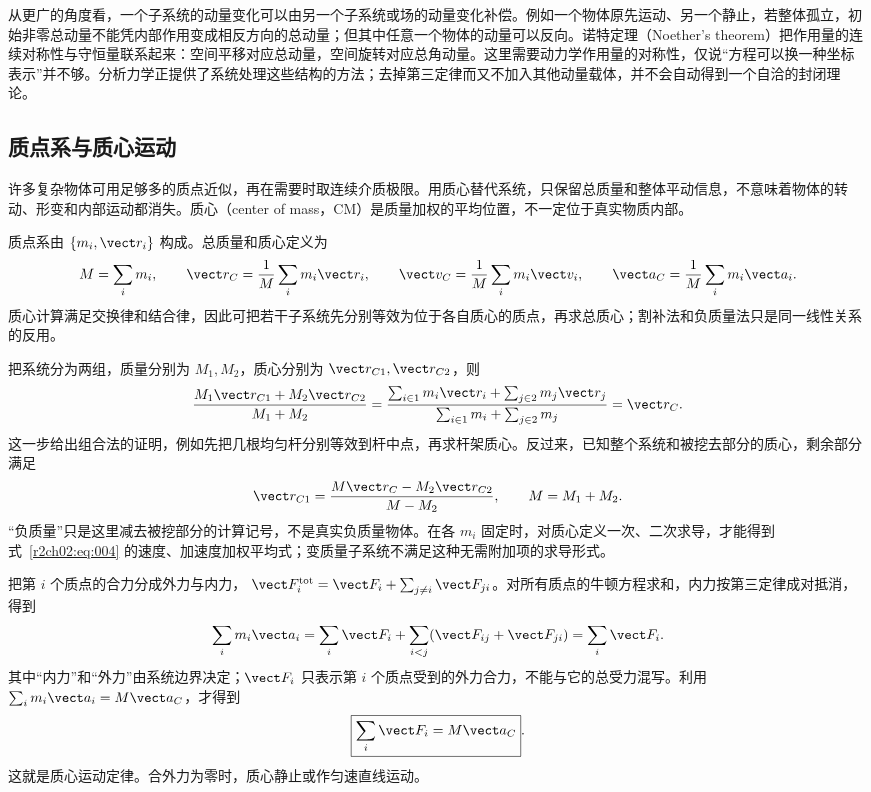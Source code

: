 从更广的角度看，一个子系统的动量变化可以由另一个子系统或场的动量变化补偿。例如一个物体原先运动、另一个静止，若整体孤立，初始非零总动量不能凭内部作用变成相反方向的总动量；但其中任意一个物体的动量可以反向。诺特定理（Noether's theorem）把作用量的连续对称性与守恒量联系起来：空间平移对应总动量，空间旋转对应总角动量。这里需要动力学作用量的对称性，仅说“方程可以换一种坐标表示”并不够。分析力学正提供了系统处理这些结构的方法；去掉第三定律而又不加入其他动量载体，并不会自动得到一个自洽的封闭理论。

\subsection{质点系与质心运动}
\label{r2ch02:sec:centre-of-mass}

许多复杂物体可用足够多的质点近似，再在需要时取连续介质极限。用质心替代系统，只保留总质量和整体平动信息，不意味着物体的转动、形变和内部运动都消失。质心（center of mass，CM）是质量加权的平均位置，不一定位于真实物质内部。

质点系由 $\{m_i,\vect r_i\}$ 构成。总质量和质心定义为
\begin{equation}
 M=\sum_i m_i,\qquad
 \vect r_C=\frac1M\sum_i m_i\vect r_i,\qquad
 \vect v_C=\frac1M\sum_i m_i\vect v_i,\qquad
 \vect a_C=\frac1M\sum_i m_i\vect a_i.
 \label{r2ch02:eq:004}
\end{equation}
质心计算满足交换律和结合律，因此可把若干子系统先分别等效为位于各自质心的质点，再求总质心；割补法和负质量法只是同一线性关系的反用。

把系统分为两组，质量分别为 $M_1,M_2$，质心分别为 $\vect r_{C1},\vect r_{C2}$，则
\[
 \frac{M_1\vect r_{C1}+M_2\vect r_{C2}}{M_1+M_2}
 =\frac{\sum_{i\in1}m_i\vect r_i+\sum_{j\in2}m_j\vect r_j}
 {\sum_{i\in1}m_i+\sum_{j\in2}m_j}
 =\vect r_C.
\]
这一步给出组合法的证明，例如先把几根均匀杆分别等效到杆中点，再求杆架质心。反过来，已知整个系统和被挖去部分的质心，剩余部分满足
\[
 \vect r_{C1}=\frac{M\vect r_C-M_2\vect r_{C2}}{M-M_2},
 \qquad M=M_1+M_2.
\]
“负质量”只是这里减去被挖部分的计算记号，不是真实负质量物体。在各 $m_i$ 固定时，对质心定义一次、二次求导，才能得到式~\eqref{r2ch02:eq:004} 的速度、加速度加权平均式；变质量子系统不满足这种无需附加项的求导形式。

把第 $i$ 个质点的合力分成外力与内力，
$\vect F_i^{\rm tot}=\vect F_i+\sum_{j\ne i}\vect F_{ji}$。对所有质点的牛顿方程求和，内力按第三定律成对抵消，得到
\[
 \sum_i m_i\vect a_i
 =\sum_i\vect F_i+\sum_{i<j}(\vect F_{ij}+\vect F_{ji})
 =\sum_i\vect F_i.
\]
其中“内力”和“外力”由系统边界决定；$\vect F_i$ 只表示第 $i$ 个质点受到的外力合力，不能与它的总受力混写。利用 $\sum_i m_i\vect a_i=M\vect a_C$，才得到
\begin{equation}
 \boxed{\sum_i\vect F_i=M\vect a_C}.
 \label{r2ch02:eq:005}
\end{equation}
这就是质心运动定律。合外力为零时，质心静止或作匀速直线运动。

